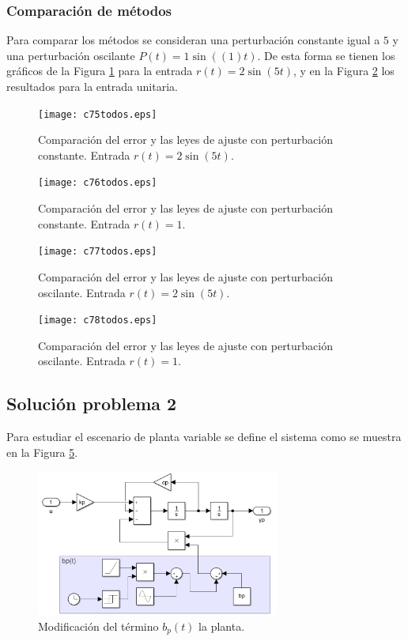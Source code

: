 \documentclass[letterpaper,11pt]{article} %
\begin{document}
\subsubsection{Comparación de métodos}
Para comparar los métodos se consideran una perturbación constante igual a $5$ y una perturbación oscilante $P(t) = 1\sin((1)t)$. De esta forma se tienen los gráficos de la Figura \ref{combinadoO} para la entrada $r(t) = 2\sin(5t)$, y en la Figura \ref{combinadoU} los resultados para la entrada unitaria.
\newpage
\begin{figure}[h]
	\centering
	\captionsetup{justification=centering}
	\texttt{[image: c75todos.eps]}
	\caption{Comparación del error y las leyes de ajuste con perturbación constante. Entrada $r(t) = 2\sin(5t)$.}
	\label{combinadoO}
\end{figure}
\begin{figure}[h]
	\centering
	\captionsetup{justification=centering}
	\texttt{[image: c76todos.eps]}
	\caption{Comparación del error y las leyes de ajuste con perturbación constante. Entrada $r(t) = 1$.}
	\label{combinadoU}
\end{figure}
\newpage
\begin{figure}[h]
	\centering
	\captionsetup{justification=centering}
	\texttt{[image: c77todos.eps]}
	\caption{Comparación del error y las leyes de ajuste con perturbación oscilante. Entrada $r(t) = 2\sin(5t)$.}
	\label{combinadoO1}
\end{figure}
\begin{figure}[h]
	\centering
	\captionsetup{justification=centering}
	\texttt{[image: c78todos.eps]}
	\caption{Comparación del error y las leyes de ajuste con perturbación oscilante. Entrada $r(t) = 1$.}
	\label{combinadoU1}
\end{figure}
\newpage
\subsection{Solución problema 2}
Para estudiar el escenario de planta variable se define el sistema como se muestra en la Figura \ref{plantabp}.
\begin{figure}[h]
	\centering
	\includegraphics[width=8cm]{plantabp.png}
	\caption{Modificación del término $b_p(t)$ la planta.}
	\label{plantabp}
\end{figure}
\end{document}
